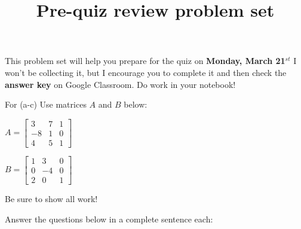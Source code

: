 \documentclass{exam}
\title{Pre-quiz review  problem set}
\author{  }
\begin{document}
\maketitle
\thispagestyle{empty}
\noindent This problem set will help you prepare for the quiz on \textbf{Monday, March 21$^{st}$} I won't be collecting it, but I encourage you to complete it and then check the \textbf{answer key} on Google Classroom. Do work in your notebook!
\begin{questions}
\question
For (a-c) Use matrices $A$ and $B$ below:
\begin{multicols}{2}
$
A = 

\begin{bmatrix}
3 &  7 & 1\\
-8 & 1 & 0\\
4 & 5 & 1
\end{bmatrix}
$
\columnbreak

$
B = 

\begin{bmatrix}
1 & 3 & 0\\
0 & -4 & 0\\
2 & 0 & 1
\end{bmatrix}
$

\end{multicols}
Be sure to show all work!


\question
Answer the questions below in a complete sentence each:

\end{questions}
\end{document}
